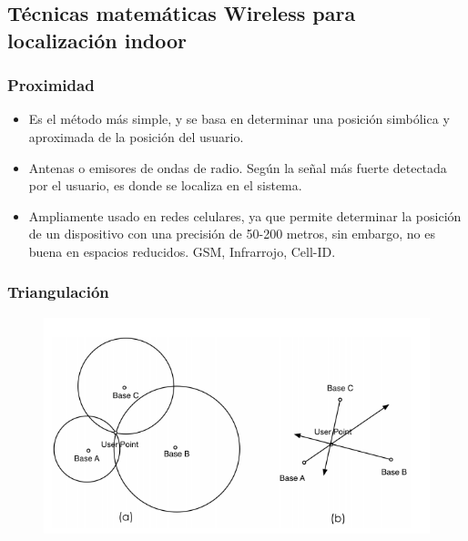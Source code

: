 \documentclass[mathserif]{beamer}
\begin{document}
\subsection{Técnicas  matemáticas Wireless para localización indoor}
\begin{frame}
\frametitle{Proximidad}

\begin{itemize}

\item Es el método más simple, y se basa en determinar una posición simbólica y aproximada de la posición del usuario.

\item Antenas o emisores de ondas de radio. Según la señal más fuerte detectada por el usuario, es donde se localiza en el sistema.

\item Ampliamente usado en redes celulares, ya que permite determinar la posición de un dispositivo con una precisión de 50-200 metros, sin embargo, no es buena en espacios reducidos. GSM, Infrarrojo, Cell-ID.
\end{itemize}


\end{frame}


\begin{frame}
\frametitle{Triangulación}

\begin{figure}
\includegraphics[width=\linewidth]{../figures/triangulacion.png}
\end{figure}

\end{frame}

\end{document}
